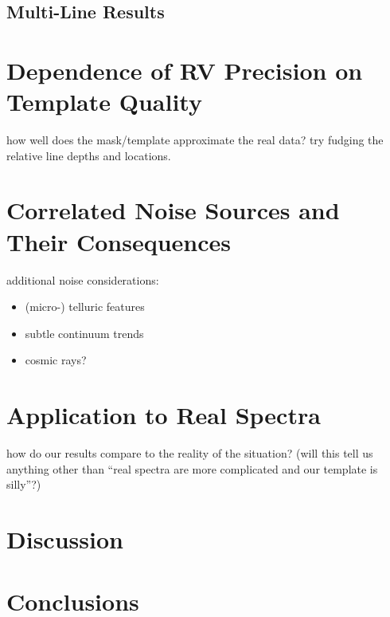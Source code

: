 \documentclass[modern]{aastex61}
\begin{document}
\subsection{Multi-Line Results}

\section{Dependence of RV Precision on Template Quality}

how well does the mask/template approximate the real data? try fudging the relative line depths and locations.

\section{Correlated Noise Sources and Their Consequences}

additional noise considerations:
\begin{itemize}
\item (micro-) telluric features
\item subtle continuum trends
\item cosmic rays?
\end{itemize}

\section{Application to Real Spectra}

how do our results compare to the reality of the situation? (will this tell us anything other than ``real spectra are more complicated and our template is silly''?)

\section{Discussion}

\section{Conclusions}

\acknowledgements


\end{document}
